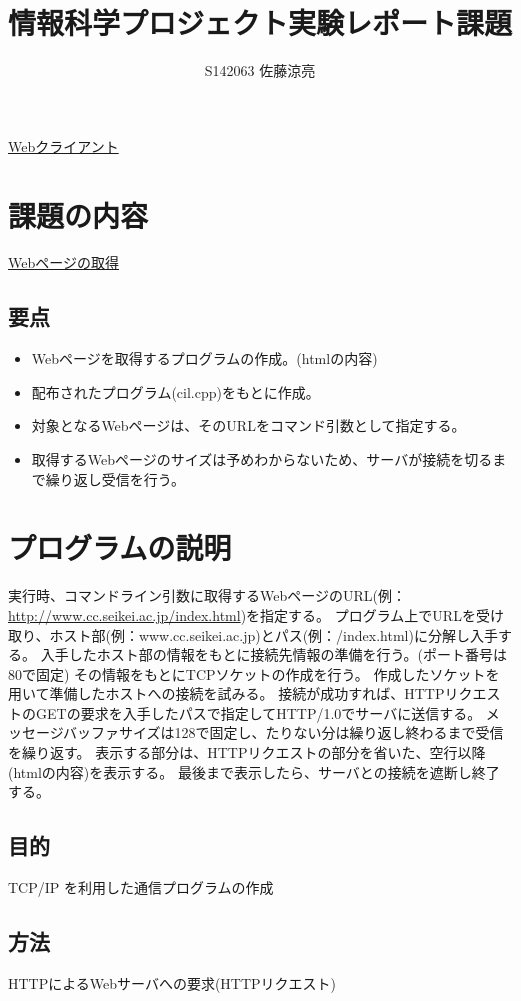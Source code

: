 \documentclass[a4j]{jarticle}
\title{情報科学プロジェクト実験レポート課題}
\author{S142063 佐藤涼亮}
\begin{document}
\maketitle
\begin{center}
{\LARGE \underline{Webクライアント}}
\end{center}
\section{課題の内容}
{\large \underline{Webページの取得}}
\subsection{要点}
\begin{itemize}
\item Webページを取得するプログラムの作成。(htmlの内容)
\item 配布されたプログラム(cil.cpp)をもとに作成。
\item 対象となるWebページは、そのURLをコマンド引数として指定する。
\item 取得するWebページのサイズは予めわからないため、サーバが接続を切るまで繰り返し受信を行う。
\end{itemize}

\section{プログラムの説明}
実行時、コマンドライン引数に取得するWebページのURL(例：\url{http://www.cc.seikei.ac.jp/index.html})を指定する。
プログラム上でURLを受け取り、ホスト部(例：www.cc.seikei.ac.jp)とパス(例：/index.html)に分解し入手する。
入手したホスト部の情報をもとに接続先情報の準備を行う。(ポート番号は80で固定)
その情報をもとにTCPソケットの作成を行う。
作成したソケットを用いて準備したホストへの接続を試みる。
接続が成功すれば、HTTPリクエストのGETの要求を入手したパスで指定してHTTP/1.0でサーバに送信する。
メッセージバッファサイズは128で固定し、たりない分は繰り返し終わるまで受信を繰り返す。
表示する部分は、HTTPリクエストの部分を省いた、空行以降(htmlの内容)を表示する。
最後まで表示したら、サーバとの接続を遮断し終了する。

\subsection{目的}
TCP/IP を利用した通信プログラムの作成

\subsection{方法}
HTTPによるWebサーバへの要求(HTTPリクエスト)
\end{document}
